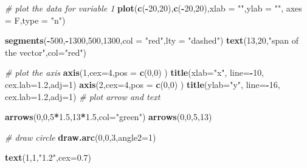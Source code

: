 \documentclass[
]{book}
\newenvironment{Shaded}{\begin{snugshade}}{\end{snugshade}}
\newcommand{\CommentTok}[1]{\textcolor[rgb]{0.56,0.35,0.01}{\textit{#1}}}
\newcommand{\DataTypeTok}[1]{\textcolor[rgb]{0.13,0.29,0.53}{#1}}
\newcommand{\DecValTok}[1]{\textcolor[rgb]{0.00,0.00,0.81}{#1}}
\newcommand{\FloatTok}[1]{\textcolor[rgb]{0.00,0.00,0.81}{#1}}
\newcommand{\KeywordTok}[1]{\textcolor[rgb]{0.13,0.29,0.53}{\textbf{#1}}}
\newcommand{\NormalTok}[1]{#1}
\newcommand{\OperatorTok}[1]{\textcolor[rgb]{0.81,0.36,0.00}{\textbf{#1}}}
\newcommand{\StringTok}[1]{\textcolor[rgb]{0.31,0.60,0.02}{#1}}
\theoremstyle{definition}
\theoremstyle{definition}
\theoremstyle{definition}
\theoremstyle{remark}
\begin{document}
\begin{Shaded}
\begin{Highlighting}[]
\CommentTok{# plot the data for variable 1}
\KeywordTok{plot}\NormalTok{(}\KeywordTok{c}\NormalTok{(}\OperatorTok{-}\DecValTok{20}\NormalTok{,}\DecValTok{20}\NormalTok{),}\KeywordTok{c}\NormalTok{(}\OperatorTok{-}\DecValTok{20}\NormalTok{,}\DecValTok{20}\NormalTok{),}\DataTypeTok{xlab =} \StringTok{""}\NormalTok{,}\DataTypeTok{ylab =} \StringTok{""}\NormalTok{,}
 \DataTypeTok{axes =}\NormalTok{ F,}\DataTypeTok{type =} \StringTok{"n"}\NormalTok{)}

\KeywordTok{segments}\NormalTok{(}\OperatorTok{-}\DecValTok{500}\NormalTok{,}\OperatorTok{-}\DecValTok{1300}\NormalTok{,}\DecValTok{500}\NormalTok{,}\DecValTok{1300}\NormalTok{,}\DataTypeTok{col =} \StringTok{"red"}\NormalTok{,}\DataTypeTok{lty =} \StringTok{"dashed"}\NormalTok{)}
\KeywordTok{text}\NormalTok{(}\DecValTok{13}\NormalTok{,}\DecValTok{20}\NormalTok{,}\StringTok{"span of the vector"}\NormalTok{,}\DataTypeTok{col=}\StringTok{"red"}\NormalTok{)}

\CommentTok{# plot the axis}
\KeywordTok{axis}\NormalTok{(}\DecValTok{1}\NormalTok{,}\DataTypeTok{cex=}\DecValTok{4}\NormalTok{,}\DataTypeTok{pos =} \KeywordTok{c}\NormalTok{(}\DecValTok{0}\NormalTok{,}\DecValTok{0}\NormalTok{) )}
\KeywordTok{title}\NormalTok{(}\DataTypeTok{xlab=}\StringTok{"x"}\NormalTok{, }\DataTypeTok{line=}\OperatorTok{-}\DecValTok{10}\NormalTok{, }\DataTypeTok{cex.lab=}\FloatTok{1.2}\NormalTok{,}\DataTypeTok{adj=}\DecValTok{1}\NormalTok{)}
\KeywordTok{axis}\NormalTok{(}\DecValTok{2}\NormalTok{,}\DataTypeTok{cex=}\DecValTok{4}\NormalTok{,}\DataTypeTok{pos =} \KeywordTok{c}\NormalTok{(}\DecValTok{0}\NormalTok{,}\DecValTok{0}\NormalTok{) )}
\KeywordTok{title}\NormalTok{(}\DataTypeTok{ylab=}\StringTok{"y"}\NormalTok{, }\DataTypeTok{line=}\OperatorTok{-}\DecValTok{16}\NormalTok{, }\DataTypeTok{cex.lab=}\FloatTok{1.2}\NormalTok{,}\DataTypeTok{adj=}\DecValTok{1}\NormalTok{)}
\CommentTok{# plot arrow and text}

\KeywordTok{arrows}\NormalTok{(}\DecValTok{0}\NormalTok{,}\DecValTok{0}\NormalTok{,}\DecValTok{5}\OperatorTok{*}\FloatTok{1.5}\NormalTok{,}\DecValTok{13}\OperatorTok{*}\FloatTok{1.5}\NormalTok{,}\DataTypeTok{col=}\StringTok{"green"}\NormalTok{)}
\KeywordTok{arrows}\NormalTok{(}\DecValTok{0}\NormalTok{,}\DecValTok{0}\NormalTok{,}\DecValTok{5}\NormalTok{,}\DecValTok{13}\NormalTok{)}

\CommentTok{# draw circle}
\KeywordTok{draw.arc}\NormalTok{(}\DecValTok{0}\NormalTok{,}\DecValTok{0}\NormalTok{,}\DecValTok{3}\NormalTok{,}\DataTypeTok{angle2=}\DecValTok{1}\NormalTok{)}

\KeywordTok{text}\NormalTok{(}\DecValTok{1}\NormalTok{,}\DecValTok{1}\NormalTok{,}\StringTok{"1.2"}\NormalTok{,}\DataTypeTok{cex=}\FloatTok{0.7}\NormalTok{)}
\end{Highlighting}
\end{Shaded}
\end{document}
